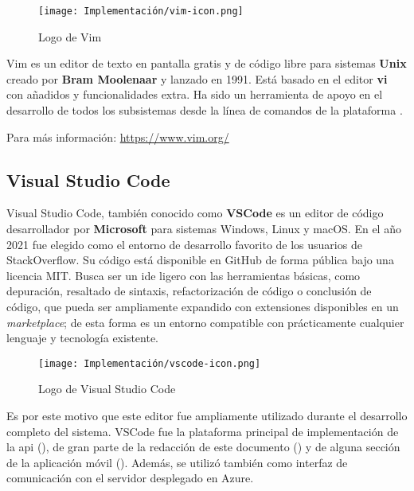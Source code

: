 \begin{wrapfigure}[6]{r}{0.25\textwidth}
    \vspace{-5pt}
    \centering
    \texttt{[image: Implementación/vim-icon.png]}
    \vspace{-10pt}
    \caption{Logo de Vim}
\end{wrapfigure}

Vim es un editor de texto en pantalla gratis y de código libre para sistemas \textbf{Unix} creado por \textbf{Bram Moolenaar} y lanzado en 1991. Está basado en el editor \textbf{vi} con añadidos y funcionalidades extra. Ha sido un herramienta de apoyo en el desarrollo de todos los subsistemas desde la línea de comandos de la plataforma .

Para más información: \href{https://www.vim.org/}{https://www.vim.org/}

\subsection{Visual Studio Code}
\label{ssec:vs_code}

Visual Studio Code, también conocido como \textbf{VSCode} es un editor de código desarrollador por \textbf{Microsoft} para sistemas Windows, Linux y macOS. En el año 2021 fue elegido como el entorno de desarrollo favorito de los usuarios de StackOverflow\cite{stackOverflow2021}. Su código está disponible en GitHub de forma pública bajo una licencia MIT. Busca ser un \acrshort{ide} ligero con las herramientas básicas, como depuración, resaltado de sintaxis, refactorización de código o conclusión de código, que pueda ser ampliamente expandido con extensiones disponibles en un \emph{marketplace}; de esta forma es un entorno compatible con prácticamente cualquier lenguaje y tecnología existente.

\begin{wrapfigure}[6]{l}{0.2\textwidth}
    \vspace{-25pt}
    \centering
    \texttt{[image: Implementación/vscode-icon.png]}
    \vspace{-10pt}
    \caption{Logo de Visual Studio Code}
\end{wrapfigure}

Es por este motivo que este editor fue ampliamente utilizado durante el desarrollo completo del sistema. VSCode fue la plataforma principal de implementación de la \acrshort{api} (), de gran parte de la redacción de este documento () y de alguna sección de la aplicación móvil (). Además, se utilizó también como interfaz de comunicación con el servidor desplegado en Azure.

